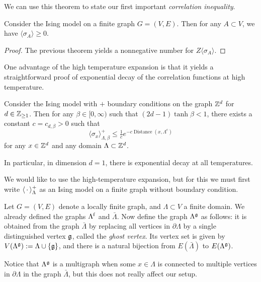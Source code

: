 We can use this theorem to state our first important \emph{correlation inequality}.

\begin{theorem}
    Consider the Ising model on a finite graph $G=(V,E)$.
    Then for any $A\subset V$, we have
    \(
        \langle\sigma_A\rangle\geq 0
    \).
\end{theorem}

\begin{proof}
    The previous theorem yields a nonnegative number for $Z\langle\sigma_A\rangle$.
\end{proof}

One advantage of the high temperature expansion is that it yields a straightforward
proof of exponential decay of the correlation functions at high temperature.

\begin{theorem}
    \label{thm:Exponential decay at high temperature}
    Consider the Ising model with $+$ boundary conditions 
    on the graph $\mathbb Z^d$ for $d\in\mathbb Z_{\geq 1}$.
    Then for any $\beta\in[0,\infty)$
    such that $(2d-1)\tanh\beta < 1$,
    there exists a constant $c=c_{d,\beta}>0$
    such that
    \[
        \langle\sigma_x\rangle_{\Lambda,\beta}^+
        \leq \tfrac1ce^{-c \operatorname{Distance}(x,\Lambda^c)}
    \]
    for any $x\in\mathbb Z^d$ and any domain $\Lambda\subset\mathbb Z^d$.

    In particular, in dimension $d=1$, there is exponential decay at all temperatures.
\end{theorem}

We would like to use the high-temperature expansion,
but for this we must first write $\langle\,\cdot\,\rangle^+_\Lambda$
as an Ising model on a finite graph without boundary condition.

\begin{definition}
    \label{definition:ghost}
    Let $G=(V,E)$ denote a locally finite graph,
    and $\Lambda\subset V$ a finite domain.
    We already defined the graphs $\Lambda^{\operatorname{f}}$ and $\bar\Lambda$.
    Now define the graph $\Lambda^\mathfrak g$ as follows:
    it is obtained from the graph $\bar\Lambda$
    by replacing all vertices in $\partial\Lambda$ by a single distinguished
    vertex $\mathfrak g$, called the \emph{ghost vertex}.
    Its vertex set is given by
    \(V(\Lambda^\mathfrak g):=\Lambda\cup\{\mathfrak g\}\),
    and there is a natural bijection from $E(\bar\Lambda)$
    to $E(\Lambda^\mathfrak g)$.

    Notice that $\Lambda^\mathfrak g$ is a multigraph when some $x\in\Lambda$
    is connected to multiple vertices in $\partial\Lambda$ in the graph $\bar\Lambda$,
    but this does not really affect our setup.
\end{definition}

